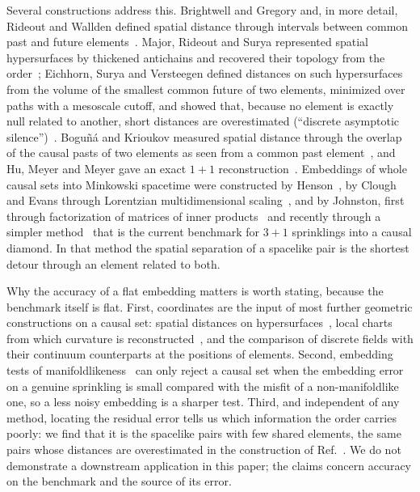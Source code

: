 \documentclass[prd,twocolumn,superscriptaddress,nofootinbib,amsmath,amssymb,floatfix]{revtex4-2}
\begin{document}
Several constructions address this. Brightwell and Gregory and, in more detail, Rideout and Wallden defined spatial distance through intervals between common past and future elements~\cite{BrightwellGregory91,RideoutWallden09}. Major, Rideout and Surya represented spatial hypersurfaces by thickened antichains and recovered their topology from the order~\cite{MRS06,MRS07}; Eichhorn, Surya and Versteegen defined distances on such hypersurfaces from the volume of the smallest common future of two elements, minimized over paths with a mesoscale cutoff, and showed that, because no element is exactly null related to another, short distances are overestimated (``discrete asymptotic silence'')~\cite{ESV19}. Bogu\~n\'a and Krioukov measured spatial distance through the overlap of the causal pasts of two elements as seen from a common past element~\cite{BK24}, and Hu, Meyer and Meyer gave an exact $1+1$ reconstruction~\cite{HMM25}. Embeddings of whole causal sets into Minkowski spacetime were constructed by Henson~\cite{Henson06}, by Clough and Evans through Lorentzian multidimensional scaling~\cite{CloughEvans16}, and by Johnston, first through factorization of matrices of inner products~\cite{Johnston22} and recently through a simpler method~\cite{Johnston25} that is the current benchmark for $3+1$ sprinklings into a causal diamond. In that method the spatial separation of a spacelike pair is the shortest detour through an element related to both.

Why the accuracy of a flat embedding matters is worth stating, because the benchmark itself is flat. First, coordinates are the input of most further geometric constructions on a causal set: spatial distances on hypersurfaces~\cite{ESV19}, local charts from which curvature is reconstructed~\cite{Madsen26}, and the comparison of discrete fields with their continuum counterparts at the positions of elements. Second, embedding tests of manifoldlikeness~\cite{CloughEvans16,Toolkit} can only reject a causal set when the embedding error on a genuine sprinkling is small compared with the misfit of a non-manifoldlike one, so a less noisy embedding is a sharper test. Third, and independent of any method, locating the residual error tells us which information the order carries poorly: we find that it is the spacelike pairs with few shared elements, the same pairs whose distances are overestimated in the construction of Ref.~\cite{ESV19}. We do not demonstrate a downstream application in this paper; the claims concern accuracy on the benchmark and the source of its error.
\end{document}
